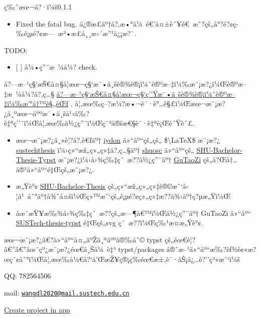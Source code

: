 ç‰ˆæœ¬å?·ï¼š0.1.1

\begin{itemize}
\tightlist
\item
  Fixed the fatal bug.
  ä¿®æ­£äº†å?‚æ•°ä¼~é€'å¤±è´¥é€~æˆ?çš„å°?é?¢ç­‰é¡µé?¢æ---~æ³•æ­£å¸¸æ›´æ''¹ä¿¡æ?¯.
\end{itemize}

TODO:

\begin{itemize}
\tightlist
\item
  {[} {]} å¼•ç''¨æ~¼å¼? check.
\end{itemize}

å?---æ--¹ç§`æŠ€å¤§å­¦æœ¬ç§`æ¯•ä¸šè®¾è®¡ï¼ˆè®ºæ--‡ï¼‰æ¨¡æ?¿ï¼Œè®ºæ--‡æ~¼å¼?å?‚ç\ldots§
\href{https://tao.sustech.edu.cn/studentService/graduation_project.html}{å?---æ--¹ç§`æŠ€å¤§å­¦æœ¬ç§`ç''Ÿæ¯•ä¸šè®¾è®¡ï¼ˆè®ºæ--‡ï¼‰æ'°å†™è§„èŒƒ}
.
å¦‚æœ‰ç--?æ¼?æ•¬è¯·è°\ldots è§£ï¼Œæœ¬æ¨¡æ?¿ä¸ºæœ¬äººæ¯•ä¸šä¹‹å‰?è‡ªç''¨ï¼Œå¦‚æœ‰ä½¿ç''¨ï¼Œç¨³å®šæ€§è¯·è‡ªè¡Œè´Ÿè´£.

\begin{itemize}
\item
  æœ¬æ¨¡æ?¿ä¸»è¦?å?‚è€ƒäº† \href{https://github.com/iydon}{iydon}
  ä»``åº``çš„çš„ \$\textbackslash LaTeX\$ æ¨¡æ?¿
  \href{https://github.com/iydon/sustechthesis}{sustechthesis}
  ï¼›ç»``æž„ç»„ç»‡å?‚ç\ldots§äº†
  \href{https://github.com/shuosc}{shuosc} ä»``åº``çš„
  \href{https://github.com/shuosc/SHU-Bachelor-Thesis-Typst}{SHU-Bachelor-Thesis-Typst}
  æ¨¡æ?¿ï¼›å›¾ç‰‡ç´~æ??ä½¿ç''¨äº†
  \href{https://github.com/GuTaoZi}{GuTaoZi}
  çš„å?Œå†\ldots å®¹ä»``åº``é‡Œçš„æ¨¡æ?¿.
\item
  æ„Ÿè°¢
  \href{https://github.com/shuosc/SHU-Bachelor-Thesis-Typst}{SHU-Bachelor-Thesis}
  çš„ç»``æž„ç»„ç»‡è®©æˆ`å­¦ä¹~åˆ°äº†å¾ˆå¤šï¼Œç»™æˆ`çš„é¡µé?¢ç»„ç»‡æ??ä¾›äº†ç?µæ„Ÿï¼Œ
\item
  åœ¨æŸ¥æ‰¾å›¾ç‰‡ç´~æ??çš„æ---¶å€™ï¼Œä½¿ç''¨äº† GuTaoZi ä»``åº``
  \href{https://github.com/GuTaoZi/SUSTech-thesis-typst}{SUSTech-thesis-typst}
  é‡Œçš„svg ç´~æ??ï¼Œç‰¹æ­¤æ„Ÿè°¢.
\end{itemize}

æœ¬æ¨¡æ?¿ã€?ä»``åº``å¤„äºŽä¸ªäººå®‰åˆ© typst
çš„éœ€è¦?â€''â€''åœ¨çº¿æ¨¡æ?¿éœ€ä¸Šä¼~è‡³ typst/packages
å®˜æ--¹ä»``åº``æ‰?èƒ½è¢«æ?œç´¢åˆ°ï¼Œå¦‚æœ‰å¼€å?{}`å'ŒæŽ¥ç®¡ç­‰éœ€æ±‚è¯·åŠ¡å¿\ldots è?''ç³»æˆ`ï¼š

QQ: 782564506

mail:
\href{mailto:wangdl2020@mail.sustech.edu.cn}{\nolinkurl{wangdl2020@mail.sustech.edu.cn}}

\href{/app?template=modern-sustech-thesis&version=0.1.1}{Create project
in app}

